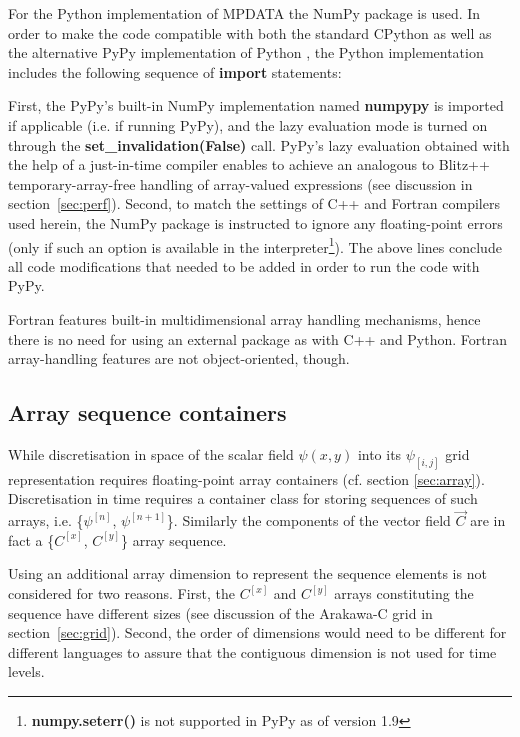 \documentclass[final,5p,times,twocolumn]{elsarticle}
\newcounter{lstnopyt}
\newcounter{linenopyt}
\newcommand*\FancyVerbStartString{}
\newcommand*\FancyVerbStopString{}
\newcommand{\codepyt}[4]{%
  \addtocounter{lstnopyt}{1}%
  \renewcommand*\FancyVerbStartString{\PY{c}{\PYZsh{}#2}}
  \renewcommand*\FancyVerbStopString{\PY{c}{\PYZsh{}#3}}
  \setcounter{FancyVerbLine}{\thelinenopyt}%
  \fvset{label={listing~P.\thelstnopyt~(Python)},rulecolor=\color{blue},stepnumber=#4}%
  \setcounter{linenopyt}{\value{FancyVerbLine}}%
}
\newcommand{\prog}[1]{{\rm\bf#1}}
\begin{document}
  For the Python implementation of MPDATA the NumPy package is used.
  In order to make the code compatible with both the standard CPython
    as well as the alternative PyPy implementation of Python \citep[][]{Bolz_et_al_2011},
    the Python implementation includes the following sequence of \prog{import} statements:
  \codepyt{code/pyt/listings.py}{listing02}{listing03}{1}
  First, the PyPy's built-in NumPy implementation named \prog{numpypy} is imported if applicable (i.e. if running PyPy), 
    and the lazy evaluation mode is turned on through the \prog{set\_invalidation(False)} call.
  PyPy's lazy evaluation obtained with the help of a just-in-time compiler enables to achieve
    an analogous to Blitz++ temporary-array-free handling of array-valued expressions 
    (see discussion in section~\ref{sec:perf}).
  Second, to match the settings of C++ and Fortran compilers used herein, the NumPy package is instructed 
    to ignore any floating-point errors (only if such an option
    is available in the interpreter\footnote{\prog{numpy.seterr()} is not supported in PyPy as of version 1.9}).
  The above lines conclude all code modifications that needed to be added in order to run
    the code with PyPy.

  Fortran features built-in multidimensional array handling mechanisms,
    hence there is no need for using an external package as with C++ and Python.
  Fortran array-handling features are not object-oriented, though.

  \subsection{Array sequence containers}\label{sec:sequence}

  While discretisation in space of the scalar field $\psi(x,y)$ into its $\psi_{[i,j]}$ 
    grid representation requires floating-point array containers (cf. section \ref{sec:array}).
  Discretisation in time requires a container class for storing
    sequences of such arrays, i.e. \{$\psi^{[n]}$, $\psi^{[n+1]}$\}.
  Similarly the components of the vector field $\vec{C}$ are in fact a \{$C^{[x]}$, $C^{[y]}$\} 
    array sequence.
 
  Using an additional array dimension to represent the sequence elements is not considered for two reasons.
  First, the $C^{[x]}$ and $C^{[y]}$ arrays constituting the sequence have different sizes
    (see discussion of the Arakawa-C grid in section~\ref{sec:grid}).
  Second, the order of dimensions would need to be different for different languages to assure that
      the contiguous dimension is not used for time levels.
\end{document}
